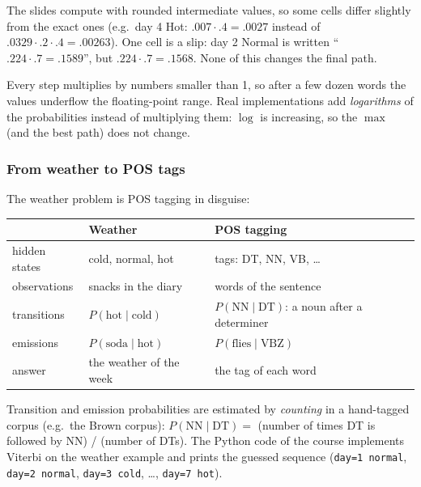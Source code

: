 \begin{nbwarning}
The slides compute with rounded intermediate values, so some cells differ slightly from
the exact ones (e.g.\ day 4 Hot: $.007 \cdot .4 = .0027$ instead of $.0329\cdot .2\cdot .4
= .00263$). One cell is a slip: day 2 Normal is written ``$.224 \cdot .7 = .1589$'', but
$.224\cdot .7 = .1568$. None of this changes the final path.
\end{nbwarning}

\begin{nbintuition}
Every step multiplies by numbers smaller than 1, so after a few dozen words the values
underflow the floating-point range. Real implementations add \emph{logarithms} of the
probabilities instead of multiplying them: $\log$ is increasing, so the $\max$ (and the
best path) does not change.
\end{nbintuition}

\subsubsection{From weather to POS tags}

The weather problem is POS tagging in disguise:

\begin{center}
\small
\begin{tabular}{@{}l l l@{}}
\toprule
 & \textbf{Weather} & \textbf{POS tagging} \\
\midrule
hidden states    & cold, normal, hot & tags: DT, NN, VB, \ldots \\
observations     & snacks in the diary & words of the sentence \\
transitions      & $P(\text{hot} \mid \text{cold})$ & $P(\text{NN} \mid \text{DT})$: a noun after a determiner \\
emissions        & $P(\text{soda} \mid \text{hot})$ & $P(\text{flies} \mid \text{VBZ})$ \\
answer           & the weather of the week & the tag of each word \\
\bottomrule
\end{tabular}
\end{center}

Transition and emission probabilities are estimated by \emph{counting} in a hand-tagged
corpus (e.g.\ the Brown corpus): $P(\text{NN}\mid\text{DT}) = $ (number of times DT is
followed by NN) / (number of DTs). The Python code of the course implements Viterbi on
the weather example and prints the guessed sequence (\texttt{day=1 normal},
\texttt{day=2 normal}, \texttt{day=3 cold}, \ldots, \texttt{day=7 hot}).

